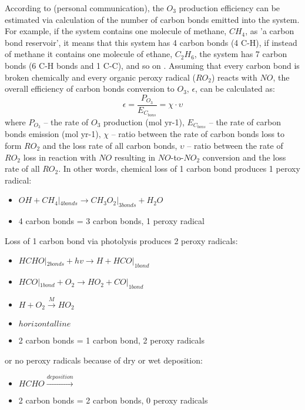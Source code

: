 \documentclass[11pt,a4paper]{article}
\begin{document}
According to \citep{Evans2014} (personal communication), the $O_3$ production efficiency can be estimated via calculation of the number of carbon bonds emitted into the system. For example, if the system contains one molecule of methane, $CH_4$, as 'a carbon bond reservoir', it means that this system has 4 carbon bonds (4 C-H), if  instead of methane it contains one molecule of ethane, $C_2H_6$, the system has 7 carbon bonds (6 C-H bonds and 1 C-C), and so on \citep{Edwards2013}. Assuming that every carbon bond is broken chemically and every organic peroxy radical ($RO_2$) reacts with $NO$, the overall efficiency of carbon bonds conversion to $O_3$, $\epsilon$, can be calculated as: 
\begin{equation}\label{eq:epsilon}
\epsilon = \dfrac{P_{O_3}}{E_{C_{bons}}} = \chi\cdot\upsilon
\end{equation}
where $P_{O_3}$ – the rate of $O_3$ production (mol yr-1), $E_{C_{bons}}$  – the rate of carbon bonds emission (mol yr-1), $\chi$ – ratio between the rate of carbon bonds loss to form $RO_2$ and the loss rate of all carbon bonds, $\upsilon$ – ratio between the rate of $RO_2$ loss in reaction with $NO$ resulting in $NO$-to-$NO_2$ conversion and the loss rate of all $RO_2$. In other words, chemical loss of 1 carbon bond produces 1 peroxy radical:
\begin{itemize}
\centering
\item[] $OH + {CH_4}|_{4 bonds} \rightarrow {CH_3O_2}|_{3 bonds} + H_2O$
\item[] 4 carbon bonds = 3 carbon bonds, 1 peroxy radical
\end{itemize}
Loss of 1 carbon bond via photolysis produces 2 peroxy radicals:
\begin{itemize}
\centering
\item[] ${HCHO}|_{2bonds} + hv \rightarrow H + {HCO}|_{1bond}$
\item[] ${HCO}|_{1bond} + O_2 \rightarrow HO_2 + {CO}|_{1bond}$
\item[] $H + O_2 \xrightarrow{M} HO_2$
\item[] $horizontal line$
\item[] 2 carbon bonds = 1 carbon bond, 2 peroxy radicals
\end{itemize}
or no peroxy radicals because of dry or wet deposition:
\begin{itemize}
\centering
\item[] $HCHO \xrightarrow{deposition}$
\item[] 2 carbon bonds = 2 carbon bonds, 0 peroxy radicals
\end{itemize}
\end{document}
